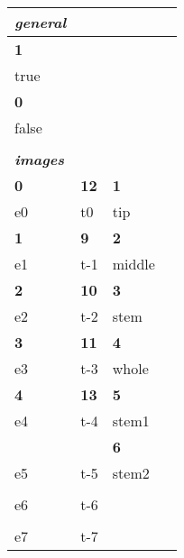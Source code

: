 \documentclass[12pt]{article}
\begin{document}





\begin{tabular}{p{1.75in}|p{1.75in}|p{1.75in}|p{1.75in}}

\huge{\emph{\textbf{general}}} & & & \\ \hline
\huge{\textbf{1}} & & & \\ \hline
true & & & \\ \hline
\huge{\textbf{0}} & & &  \\ \hline
false & & & \\ \hline
%
\\ \hline
\huge{\emph{\textbf{images}}} & & & \\ \hline
%
\huge{\textbf{0}} & \huge{\textbf{12}}       & \huge{\textbf{1}} & \\ 
e0                & t0                       & tip               & \\ \hline
\huge{\textbf{1}} & \huge{\textbf{9}}        & \huge{\textbf{2}} & \\ 
e1                & t-1                      & middle            & \\ \hline
\huge{\textbf{2}} & \huge{\textbf{10}}       & \huge{\textbf{3}} & \\ 
e2                & t-2                      & stem              & \\ \hline
\huge{\textbf{3}} & \huge{\textbf{11}}       & \huge{\textbf{4}} & \\ 
e3                & t-3                      & whole             & \\ \hline
\huge{\textbf{4}} & \huge{\textbf{13}}         & \huge{\textbf{5}} & \\ 
e4                & t-4                      & stem1             & \\ \hline
\huge{\textbf{}}  & \huge{\textbf{}}         & \huge{\textbf{6}} & \\ 
e5                & t-5                      & stem2             & \\ \hline 
\huge{\textbf{}}  & \huge{\textbf{}}         & & \\ 
e6                & t-6                      & & \\ \hline
\huge{\textbf{}}  & \huge{\textbf{}}         & & \\ 
e7                & t-7                      & & \\ \hline

\end{tabular}
\end{document}
